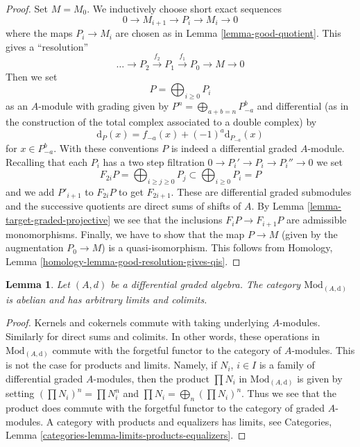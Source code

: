 \documentclass{stacks-project}
\theoremstyle{plain}
\newtheorem{lemma}[subsection]{Lemma}
\theoremstyle{definition}
\theoremstyle{remark}
\numberwithin{equation}{subsection}
\begin{document}
\begin{proof}
Set $M = M_0$. We inductively choose short exact sequences
$$
0 \to M_{i + 1} \to P_i \to M_i \to 0
$$
where the maps $P_i \to M_i$ are chosen as in Lemma \ref{lemma-good-quotient}.
This gives a ``resolution''
$$
\ldots \to P_2 \xrightarrow{f_2} P_1 \xrightarrow{f_1} P_0 \to M \to 0
$$
Then we set
$$
P = \bigoplus\nolimits_{i \geq 0} P_i
$$
as an $A$-module with grading given by
$P^n = \bigoplus_{a + b = n} P_{-a}^b$ and
differential (as in the construction of the total complex associated
to a double complex) by
$$
\text{d}_P(x) = f_{-a}(x) + (-1)^a \text{d}_{P_{-a}}(x)
$$
for $x \in P_{-a}^b$. With these conventions $P$ is indeed a differential
graded $A$-module. Recalling that each $P_i$ has a two step filtration
$0 \to P_i' \to P_i \to P_i'' \to 0$ we set
$$
F_{2i}P = \bigoplus\nolimits_{i \geq j \geq 0} P_j
\subset
\bigoplus\nolimits_{i \geq 0} P_i = P
$$
and we add $P'_{i + 1}$ to $F_{2i}P$ to get $F_{2i + 1}$.
These are differential graded submodules and the successive quotients
are direct sums of shifts of $A$. By
Lemma \ref{lemma-target-graded-projective} we see that
the inclusions $F_iP \to F_{i + 1}P$ are admissible monomorphisms.
Finally, we have to show that the map $P \to M$ (given by the
augmentation $P_0 \to M$) is a quasi-isomorphism. This follows from
Homology, Lemma \ref{homology-lemma-good-resolution-gives-qis}.
\end{proof}

\begin{lemma}
\label{lemma-dgm-abelian}
Let $(A, d)$ be a differential graded algebra. The category
$\text{Mod}_{(A, \text{d})}$ is abelian and has arbitrary limits and colimits.
\end{lemma}

\begin{proof}
Kernels and cokernels commute with taking underlying $A$-modules.
Similarly for direct sums and colimits. In other words, these operations
in $\text{Mod}_{(A, \text{d})}$ commute with the forgetful functor to the
category of $A$-modules. This is not the case for products and limits.
Namely, if $N_i$, $i \in I$ is a family of
differential graded $A$-modules, then the product $\prod N_i$ in
$\text{Mod}_{(A, \text{d})}$ is given by setting $(\prod N_i)^n = \prod N_i^n$
and $\prod N_i = \bigoplus_n (\prod N_i)^n$. Thus we see that the product
does commute with the forgetful functor to the category of graded $A$-modules.
A category with products and equalizers has limits, see
Categories, Lemma \ref{categories-lemma-limits-products-equalizers}.
\end{proof}
\end{document}
